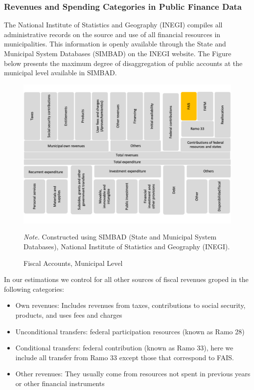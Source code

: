 \documentclass[dv_diss_main.tex]{subfiles}
\begin{document}
\subsubsection{Revenues and Spending Categories in Public Finance Data} \label{Ap:fiscalcategories}

The National Institute of Statistics and Geography (INEGI) compiles all administrative records on the source and use of all financial resources in municipalities. This information is openly available through the State and Municipal System Databases (SIMBAD) on the INEGI website. The Figure below presents the maximum degree of disaggregation of public accounts at the municipal level available in SIMBAD. 
\begin{figure}[H] 
	\centering 
	
		\centering
		\includegraphics[width=0.8\linewidth]{figures/FAIS_in_local_finances.png}
		\caption{Fiscal Accounts, Municipal Level}\label{fig:discon}
	\vspace{0.1cm}
\parbox{\textwidth}{\small 
	\footnotesize	
	\textit{Note. }Constructed using SIMBAD (State and Municipal System Databases), National Institute of Statistics and Geography (INEGI).
	}
\end{figure}

\newpage

In our estimations we control for all other sources of fiscal revenues groped in the following categories:

\begin{itemize}
    \item Own revenues: Includes revenues from taxes, contributions to social security, products, and uses fees and charges
    \item Unconditional transfers: federal participation resources (known as Ramo 28)
    \item Conditional transfers: federal contribution (known as Ramo 33), here we include all transfer from Ramo 33 except those that correspond to FAIS.
    \item Other revenues: They usually come from resources not spent in previous years or other financial instruments
\end{itemize}
\end{document}
